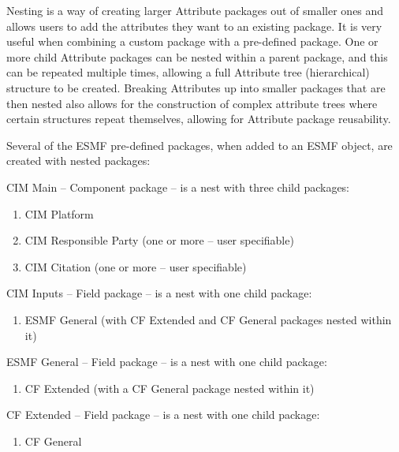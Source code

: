 %


\label{sec:AttPackNesting}


Nesting is a way of creating larger Attribute packages out of smaller ones and allows users to add the attributes they want to an existing package. It is very useful when combining a custom package with a pre-defined package. One or more child Attribute packages can be nested within a parent package, and this can be repeated multiple times, allowing a full Attribute tree (hierarchical) structure to be created.  Breaking Attributes up into smaller packages that are then nested also allows for the construction of complex attribute trees where certain structures repeat themselves, allowing for Attribute package reusability.


Several of the ESMF pre-defined packages, when added to an ESMF object, are created with nested packages:

CIM Main -- Component package -- is a nest with three child packages:
\begin{enumerate}
   \item CIM Platform
   \item CIM Responsible Party (one or more -- user specifiable)
   \item CIM Citation (one or more -- user specifiable)
\end{enumerate}

CIM Inputs -- Field package -- is a nest with one child package:
\begin{enumerate}
   \item ESMF General (with CF Extended and CF General packages nested within it)
\end{enumerate}

ESMF General -- Field package -- is a nest with one child package:
\begin{enumerate}
   \item CF Extended (with a CF General package nested within it)
\end{enumerate}

CF Extended -- Field package -- is a nest with one child package:
\begin{enumerate}
   \item CF General
\end{enumerate}
